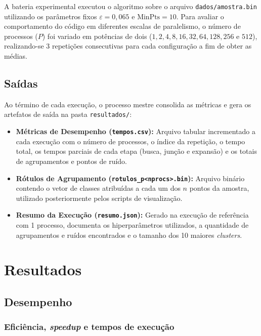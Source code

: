 \documentclass[a4paper,12pt]{article}
\begin{document}
A bateria experimental executou o algoritmo sobre o arquivo
\texttt{dados/amostra.bin} utilizando os parâmetros fixos
$\varepsilon = 0{,}065$ e $\text{MinPts} = 10$. Para avaliar o comportamento do
código em diferentes escalas de paralelismo, o número de processos ($P$) foi
variado em potências de dois ($1, 2, 4, 8, 16, 32, 64, 128, 256$ e $512$),
realizando-se 3 repetições consecutivas para cada configuração a fim de obter as
médias.

\subsection{Saídas}

Ao término de cada execução, o processo mestre consolida as métricas e gera os
artefatos de saída na pasta \texttt{resultados/}: %

\begin{itemize}
    \item \textbf{Métricas de Desempenho (\texttt{tempos.csv}):} Arquivo tabular
          incrementado a cada execução com o número de processos, o índice da
          repetição, o tempo total, os tempos parciais de cada etapa (busca,
          junção e expansão) e os totais de agrupamentos e pontos de ruído.
    \item \textbf{Rótulos de Agrupamento (\texttt{rotulos\_p<nprocs>.bin}):}
          Arquivo binário contendo o vetor de classes atribuídas a cada um dos
          $n$ pontos da amostra, utilizado posteriormente pelos scripts de
          visualização.
    \item \textbf{Resumo da Execução (\texttt{resumo.json}):} Gerado na execução
          de referência com 1 processo, documenta os hiperparâmetros utilizados,
          a quantidade de agrupamentos e ruídos encontrados e o tamanho dos 10
          maiores \textit{clusters}.
\end{itemize}

\section{Resultados}

\subsection{Desempenho}

\subsubsection{Eficiência, \textit{speedup} e tempos de execução}
\end{document}
